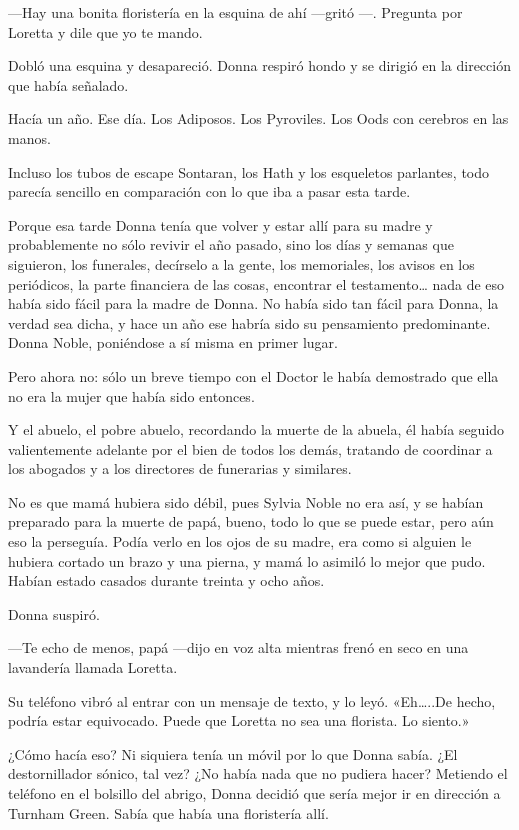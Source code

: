 ---Hay una bonita floristería en la esquina de ahí ---gritó ---.
Pregunta por Loretta y dile que yo te mando.

Dobló una esquina y desapareció. Donna respiró hondo y se dirigió en la
dirección que había señalado.

Hacía un año. Ese día. Los Adiposos. Los Pyroviles. Los Oods con
cerebros en las manos.

Incluso los tubos de escape Sontaran, los Hath y los esqueletos
parlantes, todo parecía sencillo en comparación con lo que iba a pasar
esta tarde.

Porque esa tarde Donna tenía que volver y estar allí para su madre y
probablemente no sólo revivir el año pasado, sino los días y semanas que
siguieron, los funerales, decírselo a la gente, los memoriales, los
avisos en los periódicos, la parte financiera de las cosas, encontrar el
testamento\ldots{} nada de eso había sido fácil para la madre de Donna.
No había sido tan fácil para Donna, la verdad sea dicha, y hace un año
ese habría sido su pensamiento predominante. Donna Noble, poniéndose a
sí misma en primer lugar.

Pero ahora no: sólo un breve tiempo con el Doctor le había demostrado
que ella no era la mujer que había sido entonces.

Y el abuelo, el pobre abuelo, recordando la muerte de la abuela, él
había seguido valientemente adelante por el bien de todos los demás,
tratando de coordinar a los abogados y a los directores de funerarias y
similares.

No es que mamá hubiera sido débil, pues Sylvia Noble no era así, y se
habían preparado para la muerte de papá, bueno, todo lo que se puede
estar, pero aún eso la perseguía. Podía verlo en los ojos de su madre,
era como si alguien le hubiera cortado un brazo y una pierna, y mamá lo
asimiló lo mejor que pudo. Habían estado casados durante treinta y ocho
años.

Donna suspiró.

---Te echo de menos, papá ---dijo en voz alta mientras frenó en seco en
una lavandería llamada Loretta.

Su teléfono vibró al entrar con un mensaje de texto, y lo leyó.
«Eh\ldots{}..De hecho, podría estar equivocado. Puede que Loretta no sea
una florista. Lo siento.»

¿Cómo hacía eso? Ni siquiera tenía un móvil por lo que Donna sabía. ¿El
destornillador sónico, tal vez? ¿No había nada que no pudiera hacer?
Metiendo el teléfono en el bolsillo del abrigo, Donna decidió que sería
mejor ir en dirección a Turnham Green. Sabía que había una floristería
allí.

